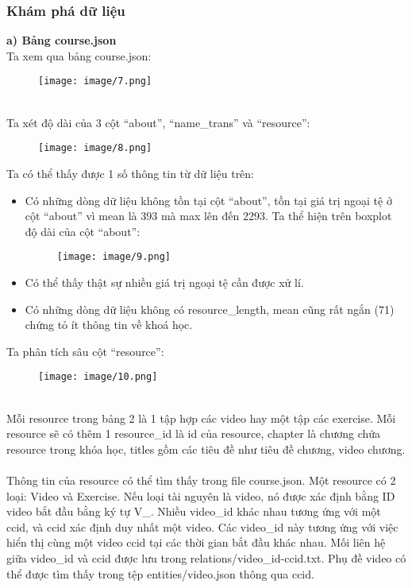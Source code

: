 \subsubsection{Khám phá dữ liệu}
\textbf{a) Bảng course.json}\\
Ta xem qua bảng course.json:
\begin{figure}[h]
    \centering
    \texttt{[image: image/7.png]}
\end{figure}\\
Ta xét độ dài của 3 cột “about”, “name\_trans” và “resource”:
\begin{figure}[h]
    \centering
    \texttt{[image: image/8.png]}
\end{figure}
\newpage
Ta có thể thấy được 1 số thông tin từ dữ liệu trên:
\begin{itemize}
    \item Có những dòng dữ liệu không tồn tại cột “about”, tồn tại giá trị ngoại tệ ở cột “about” vì mean là 393 mà max lên đến 2293. Ta thể hiện trên boxplot độ dài của cột “about”:
    \begin{figure}[h]
        \centering
        \texttt{[image: image/9.png]}
    \end{figure}
    \item Có thể thấy thật sự nhiều giá trị ngoại tệ cần được xử lí.
    \item Có những dòng dữ liệu không có resource\_length, mean cũng rất ngắn (71) chứng tỏ ít thông tin về khoá học.
\end{itemize}
Ta phân tích sâu cột “resource”:
\begin{figure}[h]
    \centering
    \texttt{[image: image/10.png]}
\end{figure}\\
Mỗi resource trong bảng 2 là 1 tập hợp các video hay một tập các exercise. Mỗi resource sẽ có thêm 1 resource\_id là id của resource, chapter là chương chứa resource trong khóa học, titles gồm các tiêu đề như tiêu đề chương, video chương.\\
\\
Thông tin của resource có thể tìm thấy trong file course.json. Một resource có 2 loại: Video và Exercise. Nếu loại tài nguyên là video, nó được xác định bằng ID video bắt đầu bằng ký tự V\_. Nhiều video\_id khác nhau tương ứng với một ccid, và ccid xác định duy nhất một video. Các video\_id này tương ứng với việc hiển thị cùng một video ccid tại các thời gian bắt đầu khác nhau. Mối liên hệ giữa video\_id và ccid được lưu trong relations/video\_id-ccid.txt. Phụ đề video có thể được tìm thấy trong tệp entities/video.json thông qua ccid.\\

